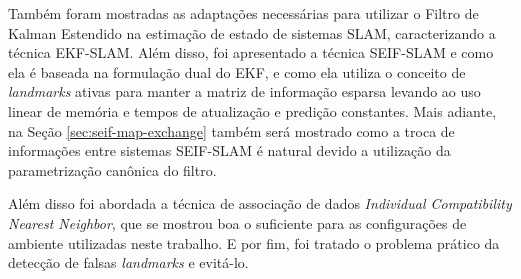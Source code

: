 Também foram mostradas as adaptações necessárias para utilizar o 
Filtro de Kalman Estendido na estimação de estado de sistemas SLAM, 
caracterizando a técnica EKF-SLAM. Além disso, foi apresentado a técnica 
SEIF-SLAM e como ela é baseada na formulação dual do EKF, e como 
ela utiliza o conceito de \textit{landmarks} ativas para manter a 
matriz de informação esparsa levando ao uso linear de memória e tempos 
de atualização e predição constantes. Mais adiante, na Seção \ref{sec:seif-map-exchange} também será mostrado como a troca de informações 
entre sistemas SEIF-SLAM é natural devido a utilização da parametrização 
canônica do filtro.

Além disso foi abordada a técnica de associação de dados 
\textit{Individual Compatibility Nearest Neighbor}, que se mostrou boa 
o suficiente para as configurações de ambiente utilizadas 
neste trabalho. E por fim, foi tratado o problema prático da detecção 
de falsas \textit{landmarks} e evitá-lo.
